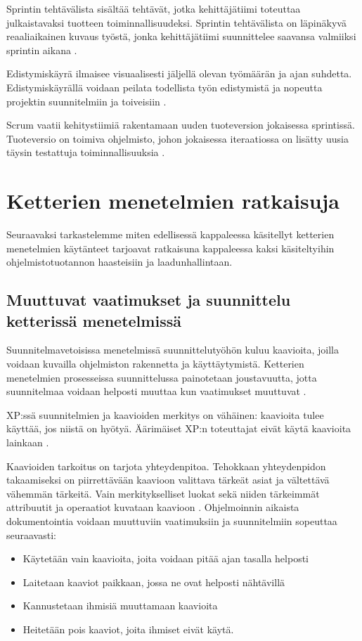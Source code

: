 \documentclass[finnish]{tktltiki2}
\theoremstyle{definition}
\theoremstyle{remark}
\begin{document}
{Sprintin tehtävälista sisältää tehtävät, jotka kehittäjätiimi toteuttaa  julkaistavaksi tuotteen toiminnallisuudeksi. Sprintin tehtävälista on läpinäkyvä reaaliaikainen kuvaus työstä, jonka kehittäjätiimi suunnittelee saavansa valmiiksi sprintin aikana \cite{SCH09}.

Edistymiskäyrä ilmaisee visuaalisesti jäljellä olevan työmäärän ja ajan suhdetta. Edistymiskäyrällä voidaan peilata todellista työn edistymistä ja nopeutta projektin suunnitelmiin ja toiveisiin \cite{SCH09}.

Scrum vaatii kehitystiimiä rakentamaan uuden tuoteversion jokaisessa sprintissä. Tuoteversio on toimiva ohjelmisto, johon jokaisessa iteraatiossa on lisätty uusia täysin testattuja toiminnallisuuksia \cite{SCH09}.

\section{Ketterien menetelmien ratkaisuja}

Seuraavaksi tarkastelemme miten edellisessä kappaleessa käsitellyt ketterien menetelmien käytänteet tarjoavat ratkaisuna kappaleessa kaksi käsiteltyihin ohjelmistotuotannon haasteisiin ja laadunhallintaan.

\subsection{Muuttuvat vaatimukset ja  suunnittelu ketterissä menetelmissä}

Suunnitelmavetoisissa menetelmissä suunnittelutyöhön kuluu kaavioita, joilla voidaan kuvailla ohjelmiston rakennetta ja käyttäytymistä. Ketterien menetelmien prosesseissa suunnittelussa painotetaan joustavuutta, jotta suunnitelmaa voidaan helposti muuttaa kun vaatimukset muuttuvat \cite{FOW01b}.

XP:ssä suunnitelmien ja kaavioiden merkitys on vähäinen: kaavioita tulee käyttää, jos niistä on hyötyä. Äärimäiset XP:n toteuttajat eivät käytä kaavioita lainkaan \cite{FOW01b}.

Kaavioiden tarkoitus on tarjota yhteydenpitoa. Tehokkaan yhteydenpidon takaamiseksi on piirrettävään kaavioon valittava tärkeät asiat ja vältettävä vähemmän tärkeitä. Vain merkitykselliset luokat sekä niiden tärkeimmät attribuutit ja operaatiot kuvataan kaavioon \cite{FOW01b}.
Ohjelmoinnin aikaista dokumentointia voidaan muuttuviin vaatimuksiin ja suunnitelmiin sopeuttaa seuraavasti: \cite{FOW01b}
\begin{itemize}
\item Käytetään vain kaavioita, joita voidaan pitää ajan tasalla helposti
\item Laitetaan kaaviot paikkaan, jossa ne ovat helposti nähtävillä
\item Kannustetaan ihmisiä muuttamaan kaavioita
\item Heitetään pois kaaviot, joita ihmiset eivät käytä.
\end{itemize}

}
\end{document}
